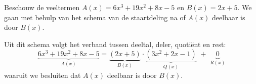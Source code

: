 \documentclass{ximera}
\begin{document}

\begin{example}
Beschouw de veeltermen $A(x) = 6x^3 + 19x^2 + 8x - 5$ en $B(x) = 2x+5$. We gaan met behulp van het schema van de staartdeling na of $A(x)$ deelbaar is door $B(x)$. 


Uit dit schema volgt het verband tussen deeltal, deler, quoti\"ent en rest:
\[
\underbrace{6x^3 + 19x^2 + 8x - 5}_{A(x)} = \underbrace{(2x+5)}_{B(x)}\cdot\underbrace{(3x^2+2x-1)}_{Q(x)} \,\, + \,\, \underbrace{0}_{R(x)} 
\]
waaruit we besluiten dat $A(x)$ deelbaar is door $B(x)$.
\end{example}
\end{document}
